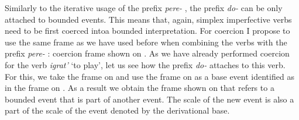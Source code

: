 Similarly to the iterative usage of the prefix \textit{pere-}  , the prefix \textit{do-}   can be only attached to bounded events. This means that, again, simplex imperfective verbs  need to be first coerced intoa bounded interpretation. For coercion I propose to use the same frame as we have used before when combining the verbs with the prefix \textit{pere-}  : coercion frame shown on . As we have already performed coercion for the verb \textit{igrat'} `to play', let us see how the prefix \textit{do-}   attaches to this verb. For this, we take the frame on  and use the frame on  as a base event identified as  in the frame on . As a result we obtain the frame shown on  that refers to a bounded event that is part of another event. The scale of the new event is also a part of the scale of the event denoted by the derivational base. 

